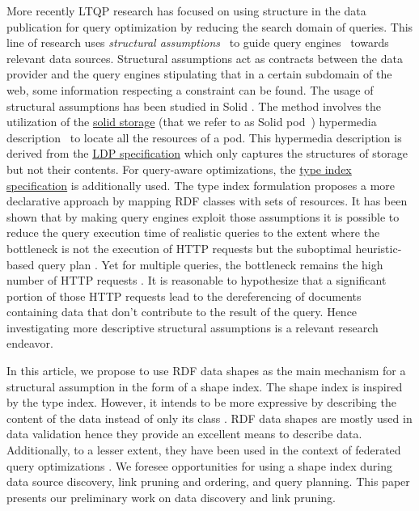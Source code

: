 More recently LTQP research has focused on using structure in the data publication for query optimization by reducing the search domain of queries.
This line of research uses \emph{structural assumptions}~\cite{Taelman2023} to guide query engines~\cite{verborgh2020guided} towards relevant data sources.
Structural assumptions act as contracts between the data provider and the query engines stipulating that in a certain subdomain of the web, some information respecting a constraint can be found.
The usage of structural assumptions has been studied in Solid \cite{Taelman2023}.
The method involves the utilization of the 
\href{https://solidproject.org/TR/protocol#resources}{solid storage} (that we refer to as Solid pod~\cite{Taelman2023}) hypermedia description~\cite{Fielding}
to locate all the resources of a pod. 
This hypermedia description is derived from the \href{https://www.w3.org/TR/ldp/}{LDP specification}
which only captures the structures of storage but not their contents.
For query-aware optimizations, the \href{https://solid.github.io/type-indexes/}{type index specification} is additionally used.
The type index formulation proposes a more declarative approach \cite{Taelman2017} by mapping RDF classes with sets of resources.
It has been shown that by making query engines exploit those assumptions it is possible to reduce the query execution time
of realistic queries to the extent where the bottleneck is not the execution of 
HTTP requests but the suboptimal heuristic-based query plan \cite{eschauzier_quweda_2023, Taelman2023}.
Yet for multiple queries, the bottleneck remains the high number of HTTP requests  \cite{eschauzier_quweda_2023}.
It is reasonable to hypothesize that a significant portion of those HTTP requests lead to the dereferencing of
documents containing data that don't contribute to the result of the query.
Hence investigating more descriptive structural assumptions is a relevant research endeavor.

In this article, we propose to use RDF data shapes as the main mechanism for a structural assumption in the form of a shape index.
The shape index is inspired by the type index.
However, it intends to be more expressive by describing the content of the data instead of only its class \cite{Taelman2017}.
RDF data shapes are mostly used in data validation \cite{Gayo2018a} hence they provide an excellent means to describe data.
Additionally, to a lesser extent, they have been used in the context of federated query optimizations \cite{kashif2021}.
We foresee opportunities for using a shape index during data source discovery, link pruning and ordering, and query planning.
This paper presents our preliminary work on data discovery and link pruning.
